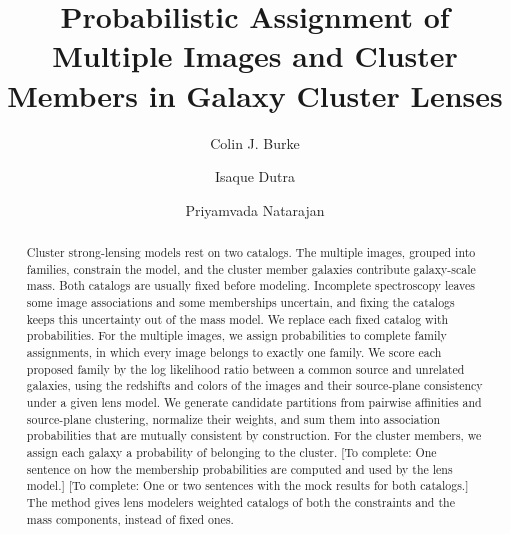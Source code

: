 \documentclass[twocolumn,twocolappendix,linenumbers]{aastex701}
\newcommand{\todo}[1]{\textcolor{red!65!black}{[To complete: #1]}}
\begin{document}
\title{Probabilistic Assignment of Multiple Images and Cluster Members in Galaxy Cluster Lenses}

\author[0000-0001-9947-6911]{Colin J. Burke}

\author[0000-0001-7040-4930]{Isaque Dutra}

\author[0000-0002-5554-8896]{Priyamvada Natarajan}

\begin{abstract}
Cluster strong-lensing models rest on two catalogs.
The multiple images, grouped into families, constrain the model, and the cluster member galaxies contribute galaxy-scale mass.
Both catalogs are usually fixed before modeling.
Incomplete spectroscopy leaves some image associations and some memberships uncertain, and fixing the catalogs keeps this uncertainty out of the mass model.
We replace each fixed catalog with probabilities.
For the multiple images, we assign probabilities to complete family assignments, in which every image belongs to exactly one family.
We score each proposed family by the log likelihood ratio between a common source and unrelated galaxies, using the redshifts and colors of the images and their source-plane consistency under a given lens model.
We generate candidate partitions from pairwise affinities and source-plane clustering, normalize their weights, and sum them into association probabilities that are mutually consistent by construction.
For the cluster members, we assign each galaxy a probability of belonging to the cluster.
\todo{One sentence on how the membership probabilities are computed and used by the lens model.}
\todo{One or two sentences with the mock results for both catalogs.}
The method gives lens modelers weighted catalogs of both the constraints and the mass components, instead of fixed ones.
\end{abstract}

\end{document}
